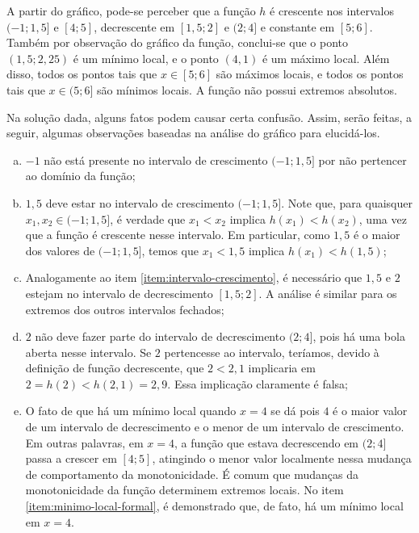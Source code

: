 \begin{solution}
	A partir do gráfico, pode-se perceber que a função $h$ é crescente nos intervalos $(-1;1{,}5]$ e $[4;5]$,
	decrescente em $[1,5; 2]$ e $(2;4]$ e constante em $[5;6]$.     
	Também por observação do gráfico da função, conclui-se que o ponto $(1{,}5; 2{,}25)$ é um mínimo local,
	e o ponto $(4,1)$ é um máximo local. 
	Além disso, todos os pontos tais que $x \in [5;6]$ são máximos locais,
	e todos os pontos tais que $x \in (5; 6]$ são mínimos locais.
	A função não possui extremos absolutos.

	Na solução dada, alguns fatos podem causar certa confusão. 
	Assim, serão feitas, a seguir, algumas observações baseadas na análise do gráfico para elucidá-los.
	\begin{enumerate}[(a)]
		\item $-1$ não está presente no intervalo de crescimento $(-1;1{,}5]$ por não pertencer ao domínio da função;
		\item \label{item:intervalo-crescimento} $1{,}5$ deve estar no intervalo de crescimento $(-1;1{,}5]$. 
		Note que, para quaisquer $x_1, x_2 \in (-1;1{,}5]$, é verdade que $x_1 < x_2$ implica $h(x_1) < h(x_2)$,
		uma vez que a função é crescente nesse intervalo. 
		Em particular, como $1{,}5$ é o maior dos valores de $(-1;1{,}5]$, 
		temos que $x_1 < 1{,}5$ implica $h(x_1) < h(1{,}5)$;
		\item Analogamente ao item \ref{item:intervalo-crescimento},
		é necessário que $1{,}5$ e $2$ estejam no intervalo de decrescimento $[1,5; 2]$.
		A análise é similar para os extremos dos outros intervalos fechados;
		\item $2$ não deve fazer parte do intervalo de decrescimento $(2; 4]$, 
		pois há uma bola aberta nesse intervalo. 
		Se $2$ pertencesse ao intervalo, teríamos, devido à definição de função decrescente,
		que $2<2{,}1$ implicaria em $2 = h(2) < h(2{,}1) = 2{,}9$. 
		Essa implicação claramente é falsa;
		\item \label{item:minimo-local} O fato de que há um mínimo local quando $x = 4$ se dá pois $4$ é o maior valor de um intervalo de decrescimento e o menor de um intervalo de crescimento. 
		Em outras palavras, em $x=4$, a função que estava decrescendo em $(2;4]$ passa a crescer em $[4;5]$,
		atingindo o menor valor localmente nessa mudança de comportamento da monotonicidade. 
		É comum que mudanças da monotonicidade da função determinem extremos locais.
		No item \ref{item:minimo-local-formal}, é demonstrado que, de fato, há um mínimo local em $x=4$.

\end{enumerate}
\end{solution}
